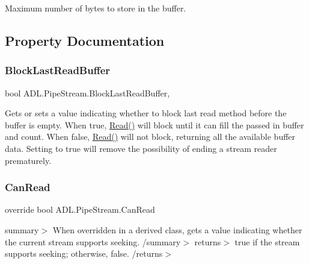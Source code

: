 Maximum number of bytes to store in the buffer. 



\subsection{Property Documentation}
\mbox{\label{class_a_d_l_1_1_pipe_stream_af05e530e849bfee481290e8139f27379}} 
\subsubsection{\texorpdfstring{Block\+Last\+Read\+Buffer}{BlockLastReadBuffer}}
{\footnotesize\ttfamily bool A\+D\+L.\+Pipe\+Stream.\+Block\+Last\+Read\+Buffer\hspace{0.3cm}{\ttfamily [get]}, {\ttfamily [set]}}



Gets or sets a value indicating whether to block last read method before the buffer is empty. When true, \mbox{\hyperlink{class_a_d_l_1_1_pipe_stream_ada829c0b71d6896e2bb3cd5d37ccba34}{Read()}} will block until it can fill the passed in buffer and count. When false, \mbox{\hyperlink{class_a_d_l_1_1_pipe_stream_ada829c0b71d6896e2bb3cd5d37ccba34}{Read()}} will not block, returning all the available buffer data. Setting to true will remove the possibility of ending a stream reader prematurely. 

\mbox{\label{class_a_d_l_1_1_pipe_stream_a194eae1c5b19a0999a5d12bcef00efd9}} 
\subsubsection{\texorpdfstring{Can\+Read}{CanRead}}
{\footnotesize\ttfamily override bool A\+D\+L.\+Pipe\+Stream.\+Can\+Read\hspace{0.3cm}{\ttfamily [get]}}

summary$>$ When overridden in a derived class, gets a value indicating whether the current stream supports seeking. /summary$>$ returns$>$ true if the stream supports seeking; otherwise, false. /returns$>$ \mbox{\label{class_a_d_l_1_1_pipe_stream_ad891fa332a41aeb44026c5a89ddc36e8}} 
